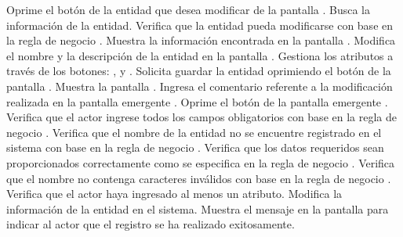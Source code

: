  \begin{UCtrayectoria}
    \UCpaso[\UCactor] Oprime el botón \btnEditar de la entidad que desea modificar de la pantalla .
    \UCpaso[\UCsist] Busca la información de la entidad.
	\UCpaso[\UCsist] Verifica que la entidad pueda modificarse con base en la regla de negocio . 
    \UCpaso[\UCsist] Muestra la información encontrada en la pantalla . \label{cu11.2:muestra}
    \UCpaso[\UCactor] Modifica el nombre y la descripción de la entidad en la pantalla . \label{cu11.2:ingresaDatos}
    \UCpaso[\UCactor] Gestiona los atributos a través de los botones: , \btnEditar y \btnEliminar. \label{cu11.2:gestionar}
    \UCpaso[\UCactor] Solicita guardar la entidad oprimiendo el botón  de la pantalla . 
    \UCpaso[\UCsist] Muestra la pantalla .
    \UCpaso[\UCactor] Ingresa el comentario referente a la modificación realizada en la pantalla emergente . \label{cu11.2:ingresaComentario}
    \UCpaso[\UCactor] Oprime el botón  de la pantalla emergente . 	
    \UCpaso[\UCsist] Verifica que el actor ingrese todos los campos obligatorios con base en la regla de negocio  . 
    \UCpaso[\UCsist] Verifica que el nombre de la entidad no se encuentre registrado en el sistema con base en la regla de negocio  . 
    \UCpaso[\UCsist] Verifica que los datos requeridos sean proporcionados correctamente como se especifica en la regla de negocio . 
    \UCpaso[\UCsist] Verifica que el nombre no contenga caracteres inválidos con base en la regla de negocio . 
    \UCpaso[\UCsist] Verifica que el actor haya ingresado al menos un atributo. 
    \UCpaso[\UCsist] Modifica la información de la entidad en el sistema.
    \UCpaso[\UCsist] Muestra el mensaje  en la pantalla  
    para indicar al actor que el registro se ha realizado exitosamente.
 \end{UCtrayectoria}
 
